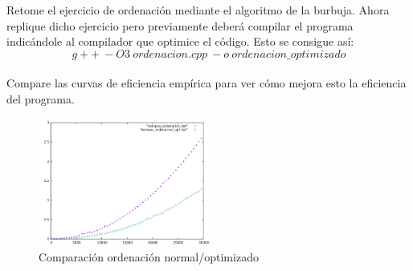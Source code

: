 \documentclass[titlepage, 12pt,a4paper]{article}
\begin{document}
Retome el ejercicio de ordenación mediante el algoritmo de la burbuja. Ahora replique
dicho ejercicio pero previamente deberá compilar el programa indicándole al compilador
que optimice el código. Esto se consigue así:
$$g++\ -O3\ ordenacion.cpp\ -o\ ordenacion\_optimizado$$
\\
Compare las curvas de eficiencia empírica para ver cómo mejora esto la eficiencia del
programa.
\\


\begin{figure}[!ht]
  \caption{Comparación ordenación normal/optimizado}
  \centering
    \includegraphics[width=0.5\textwidth]{./img/ef_pract_ej_6.png}
\end{figure}
 
\vspace {1em}  	
\end{document}
